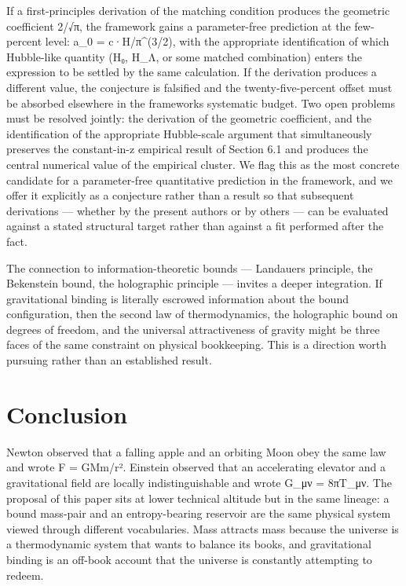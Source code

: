 \documentclass[11pt]{article}
\begin{document}
If a first-principles derivation of the matching condition produces the geometric coefficient 2/√π, the framework gains a parameter-free prediction at the few-percent level: a\_0 = c·H/π\^{}(3/2), with the appropriate identification of which Hubble-like quantity (H₀, H\_Λ, or some matched combination) enters the expression to be settled by the same calculation. If the derivation produces a different value, the conjecture is falsified and the twenty-five-percent offset must be absorbed elsewhere in the framework\textquotesingle s systematic budget. Two open problems must be resolved jointly: the derivation of the geometric coefficient, and the identification of the appropriate Hubble-scale argument that simultaneously preserves the constant-in-z empirical result of Section 6.1 and produces the central numerical value of the empirical cluster. We flag this as the most concrete candidate for a parameter-free quantitative prediction in the framework, and we offer it explicitly as a conjecture rather than a result so that subsequent derivations --- whether by the present authors or by others --- can be evaluated against a stated structural target rather than against a fit performed after the fact.

The connection to information-theoretic bounds --- Landauer\textquotesingle s principle, the Bekenstein bound, the holographic principle --- invites a deeper integration. If gravitational binding is literally escrowed information about the bound configuration, then the second law of thermodynamics, the holographic bound on degrees of freedom, and the universal attractiveness of gravity might be three faces of the same constraint on physical bookkeeping. This is a direction worth pursuing rather than an established result.

\section{Conclusion}\label{conclusion}

Newton observed that a falling apple and an orbiting Moon obey the same law and wrote F = GMm/r². Einstein observed that an accelerating elevator and a gravitational field are locally indistinguishable and wrote G\_μν = 8πT\_μν. The proposal of this paper sits at lower technical altitude but in the same lineage: a bound mass-pair and an entropy-bearing reservoir are the same physical system viewed through different vocabularies. Mass attracts mass because the universe is a thermodynamic system that wants to balance its books, and gravitational binding is an off-book account that the universe is constantly attempting to redeem.
\end{document}
